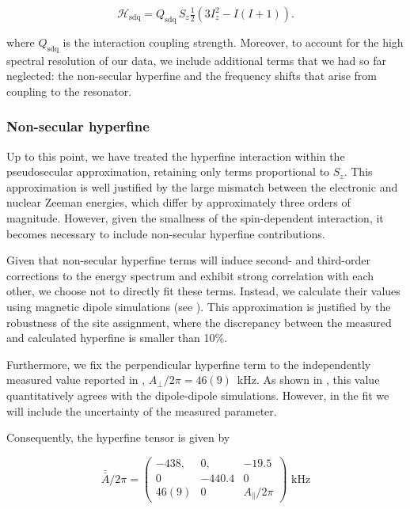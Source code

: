 \begin{equation}\label{eq:SDQ}
\mathcal{H}_\mathrm{sdq} = Q_\mathrm{sdq} \, S_z \tfrac{1}{2} \left(3 I_z^2 - I(I+1) \right).
\end{equation}

where $Q_\mathrm{sdq}$ is the interaction coupling strength. Moreover, to account for the high spectral resolution of our data, we include additional terms that we had so far neglected: the non-secular hyperfine and the frequency shifts that arise from coupling to the resonator.

\subsubsection{Non-secular hyperfine}

Up to this point, we have treated the hyperfine interaction within the pseudosecular approximation, retaining only terms proportional to $S_z$. This approximation is well justified by the large mismatch between the electronic and nuclear Zeeman energies, which differ by approximately three orders of magnitude. However, given the smallness of the spin-dependent interaction, it becomes necessary to include non-secular hyperfine contributions.

Given that non-secular hyperfine terms will induce second- and third-order corrections to the energy spectrum and exhibit strong correlation with each other, we choose not to directly fit these terms. Instead, we calculate their values using magnetic dipole simulations (see ). This approximation is justified by the robustness of the site assignment, where the discrepancy between the measured and calculated hyperfine is smaller than 10\%. 

Furthermore, we fix the perpendicular hyperfine term to the independently measured value reported in , $A_\perp/2\pi = 46(9)$~kHz. As shown in , this value quantitatively agrees with the dipole-dipole simulations. However, in the fit we will include the uncertainty of the measured parameter.

Consequently, the hyperfine tensor is given by 

\begin{equation}
\bar{\bar{A}}/2\pi=\begin{pmatrix}
-438, &  0,    &  -19.5\\
0     & -440.4 &       0\\
46(9) & 0      & A_\parallel/2\pi
\end{pmatrix} \text{~kHz}
\end{equation}

